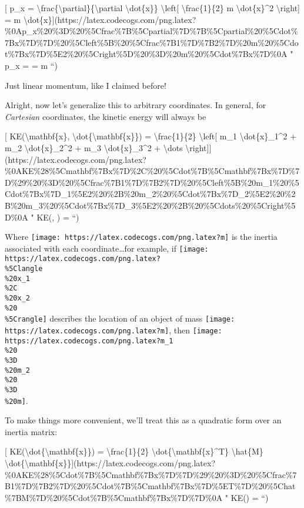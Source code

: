 \documentclass[]{article}
\begin{document}
{[} p\_x =
\textbackslash{}frac\{\textbackslash{}partial\}\{\textbackslash{}partial
\textbackslash{}dot\{x\}\} \textbackslash{}left{[}
\textbackslash{}frac\{1\}\{2\} m \textbackslash{}dot\{x\}\^{}2
\textbackslash{}right{]} = m
\textbackslash{}dot\{x\}{]}(https://latex.codecogs.com/png.latex?\%0Ap\_x\%20\%3D\%20\%5Cfrac\%7B\%5Cpartial\%7D\%7B\%5Cpartial\%20\%5Cdot\%7Bx\%7D\%7D\%20\%5Cleft\%5B\%20\%5Cfrac\%7B1\%7D\%7B2\%7D\%20m\%20\%5Cdot\%7Bx\%7D\%5E2\%20\%5Cright\%5D\%20\%3D\%20m\%20\%5Cdot\%7Bx\%7D\%0A
" p\_x = 
 = m  ``)

Just linear momentum, like I claimed before!

Alright, now let's generalize this to arbitrary coordinates. In general, for
\emph{Cartesian} coordinates, the kinetic energy will always be

{[} KE(\textbackslash{}mathbf\{x\},
\textbackslash{}dot\{\textbackslash{}mathbf\{x\}\}) =
\textbackslash{}frac\{1\}\{2\} \textbackslash{}left{[} m\_1
\textbackslash{}dot\{x\}\_1\^{}2 + m\_2 \textbackslash{}dot\{x\}\_2\^{}2 + m\_3
\textbackslash{}dot\{x\}\_3\^{}2 + \textbackslash{}dots
\textbackslash{}right{]}{]}(https://latex.codecogs.com/png.latex?\%0AKE\%28\%5Cmathbf\%7Bx\%7D\%2C\%20\%5Cdot\%7B\%5Cmathbf\%7Bx\%7D\%7D\%29\%20\%3D\%20\%5Cfrac\%7B1\%7D\%7B2\%7D\%20\%5Cleft\%5B\%20m\_1\%20\%5Cdot\%7Bx\%7D\_1\%5E2\%20\%2B\%20m\_2\%20\%5Cdot\%7Bx\%7D\_2\%5E2\%20\%2B\%20m\_3\%20\%5Cdot\%7Bx\%7D\_3\%5E2\%20\%2B\%20\%5Cdots\%20\%5Cright\%5D\%0A
" KE(, ) = 
``)

Where \texttt{[image: https://latex.codecogs.com/png.latex?m]} is the inertia
associated with each coordinate\ldots{}for example, if
\texttt{[image: https://latex.codecogs.com/png.latex?\\\%5Clangle\\\%20x\_1\\\%2C\\\%20x\_2\\\%20\\\%5Crangle]}
describes the location of an object of mass
\texttt{[image: https://latex.codecogs.com/png.latex?m]}, then
\texttt{[image: https://latex.codecogs.com/png.latex?m\_1\\\%20\\\%3D\\\%20m\_2\\\%20\\\%3D\\\%20m]}.

To make things more convenient, we'll treat this as a quadratic form over an
inertia matrix:

{[} KE(\textbackslash{}dot\{\textbackslash{}mathbf\{x\}\}) =
\textbackslash{}frac\{1\}\{2\}
\textbackslash{}dot\{\textbackslash{}mathbf\{x\}\^{}T\} \textbackslash{}hat\{M\}
\textbackslash{}dot\{\textbackslash{}mathbf\{x\}\}{]}(https://latex.codecogs.com/png.latex?\%0AKE\%28\%5Cdot\%7B\%5Cmathbf\%7Bx\%7D\%7D\%29\%20\%3D\%20\%5Cfrac\%7B1\%7D\%7B2\%7D\%20\%5Cdot\%7B\%5Cmathbf\%7Bx\%7D\%5ET\%7D\%20\%5Chat\%7BM\%7D\%20\%5Cdot\%7B\%5Cmathbf\%7Bx\%7D\%7D\%0A
" KE() =    
``)
\end{document}
